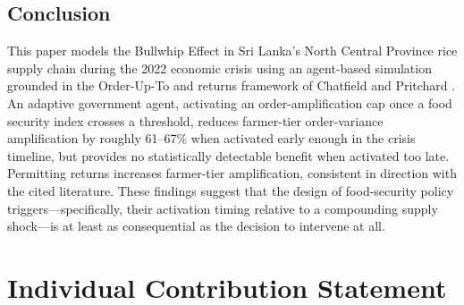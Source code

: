 \documentclass[final,onefignum,onetabnum]{siuro250211}
\begin{document}
\subsection{Conclusion}

This paper models the Bullwhip Effect in Sri Lanka's North Central Province rice supply chain
during the 2022 economic crisis using an agent-based simulation grounded in the Order-Up-To and
returns framework of Chatfield and Pritchard \cite{ChatfieldPritchard2013}. An adaptive government
agent, activating an order-amplification cap once a food security index crosses a threshold,
reduces farmer-tier order-variance amplification by roughly 61--67\% when activated early enough
in the crisis timeline, but provides no statistically detectable benefit when activated too late.
Permitting returns increases farmer-tier amplification, consistent in direction with the cited
literature. These findings suggest that the design of food-security policy triggers---specifically,
their activation timing relative to a compounding supply shock---is at least as consequential as
the decision to intervene at all.

\section{Individual Contribution Statement}
\label{sec:contributions}
\end{document}
